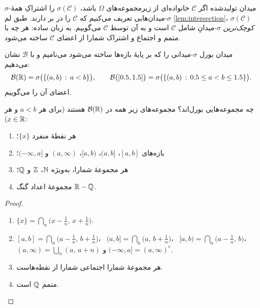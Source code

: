 \begin{definition}[label=def:generated]{$\sigma$-میدان تولیدشده}
اگر $\mathcal C$ خانواده‌ای از زیرمجموعه‌های $\Omega$ باشد، $\sigma(\mathcal C)$ را اشتراکِ همهٔ $\sigma$-میدان‌هایی تعریف می‌کنیم که $\mathcal C$ را در بر دارند. طبق لم \ref{lem:intersection}، $\sigma(\mathcal C)$ \emph{کوچک‌ترین} $\sigma$-میدانِ شامل $\mathcal C$ است و به آن  توسط $\mathcal C$ می‌گوییم. به زبان ساده: هر چه با متمم و اجتماع و اشتراک شمارا از اعضای $\mathcal C$ ساخته می‌شود.
\end{definition}

\begin{definition}[label=def:borel]{میدان بورل}
$\sigma$-میدانی را که بر پایهٔ بازه‌ها ساخته می‌شود  می‌نامیم و با $\mathcal B$ نشان می‌دهیم:
\[ \mathcal B(\mathbb{R})=\sigma\bigl(\left\{(a,b) \,:\, a<b\right\}\bigr),\qquad \mathcal B\bigl([0.5,1.5]\bigr)=\sigma\bigl(\left\{(a,b) \,:\, 0.5\le a<b\le1.5\right\}\bigr). \]
اعضای آن را  می‌گوییم.
\end{definition}

\begin{proposition}[label=prop:borel-members]{چه مجموعه‌هایی بورل‌اند؟}
مجموعه‌های زیر همه در $\mathcal B(\mathbb{R})$ هستند (برای هر $a<b$ و هر $x\in\mathbb{R}$):
\begin{enumerate}
  \item هر نقطهٔ منفرد $\{x\}$؛
  \item بازه‌های $[a,b]$، $(a,b]$، $[a,b)$، $(a,\infty)$ و $(-\infty,a]$؛
  \item هر مجموعهٔ شمارا، به‌ویژه $\mathbb{N}$، $\mathbb{Z}$ و $\mathbb{Q}$؛
  \item مجموعهٔ اعداد گنگ $\mathbb{R}-\mathbb{Q}$.
\end{enumerate}
\end{proposition}

\begin{proof}
\begin{enumerate}
  \item $\{x\}=\bigcap_{n}\bigl(x-\tfrac1n,\,x+\tfrac1n\bigr)$.
  \item $[a,b]=\bigcap_{n}\bigl(a-\tfrac1n,\,b+\tfrac1n\bigr)$، \ $(a,b]=\bigcap_{n}\bigl(a,\,b+\tfrac1n\bigr)$، \ $[a,b)=\bigcap_n\bigl(a-\tfrac1n,\,b\bigr)$، \ $(a,\infty)=\bigcup_{n}(a,\,a+n)$ و $(-\infty,a]=(a,\infty)^c$.
  \item هر مجموعهٔ شمارا اجتماعی شمارا از نقطه‌هاست.
  \item متمم $\mathbb{Q}$ است.
\end{enumerate}
\end{proof}

